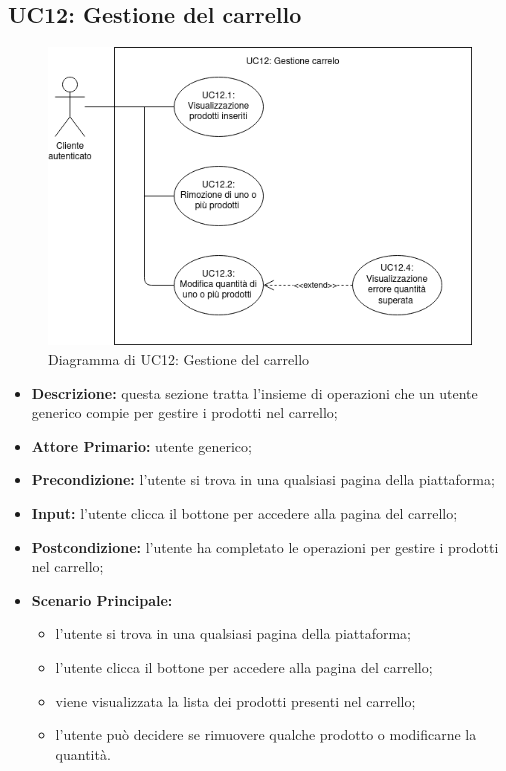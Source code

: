 \subsection{UC12: Gestione del carrello}
\label{sec:UC12}
\begin{figure}[!ht]
    \caption{Diagramma di UC12: Gestione del carrello}
    \vspace{10px}
    \includegraphics[scale=0.5]{../../../Images/AnalisiRequisiti/UC12}
    \centering
\end{figure}
\begin{itemize}
    \item \textbf{Descrizione:} questa sezione tratta l'insieme di operazioni che un utente generico compie per gestire i prodotti nel carrello;
    \item \textbf{Attore Primario:} utente generico;
    \item \textbf{Precondizione:} l'utente si trova in una qualsiasi pagina della piattaforma;
    \item \textbf{Input:} l'utente clicca il bottone per accedere alla pagina del carrello;
    \item \textbf{Postcondizione:} l'utente ha completato le operazioni per gestire i prodotti nel carrello;
    \item \textbf{Scenario Principale:}
          \begin{itemize}
              \item l'utente si trova in una qualsiasi pagina della piattaforma;
              \item l'utente clicca il bottone per accedere alla pagina del carrello;
              \item viene visualizzata la lista dei prodotti presenti nel carrello;
              \item l'utente può decidere se rimuovere qualche prodotto o modificarne la quantità.
          \end{itemize}
\end{itemize}
